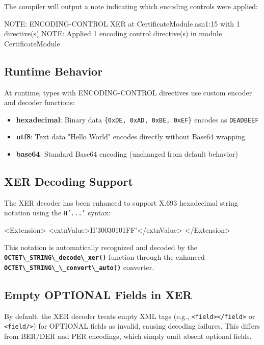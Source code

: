 \documentclass[english,oneside,12pt]{book}
\newcommand{\code}[1]{\texttt{\textbf{\lstinline{#1}}}}
\begin{document}
The compiler will output a note indicating which encoding controls were applied:

\begin{bash}
NOTE: ENCODING-CONTROL XER at CertificateModule.asn1:15 with 1 directive(s)
NOTE: Applied 1 encoding control directive(s) in module CertificateModule
\end{bash}

\subsection*{Runtime Behavior}

At runtime, types with ENCODING-CONTROL directives use custom encoder and decoder functions:

\begin{itemize}
\item \textbf{hexadecimal}: Binary data \texttt{\{0xDE, 0xAD, 0xBE, 0xEF\}} encodes as \texttt{DEADBEEF}
\item \textbf{utf8}: Text data "Hello World" encodes directly without Base64 wrapping
\item \textbf{base64}: Standard Base64 encoding (unchanged from default behavior)
\end{itemize}

\subsection*{XER Decoding Support}

The XER decoder has been enhanced to support X.693 hexadecimal string notation using 
the \texttt{H'...'} syntax:

\begin{example}
<Extension>
    <extnValue>H'30030101FF'</extnValue>
</Extension>
\end{example}

This notation is automatically recognized and decoded by the \code{OCTET\_STRING\_decode\_xer()} 
function through the enhanced \code{OCTET\_STRING\_\_convert\_auto()} converter.

\subsection*{Empty OPTIONAL Fields in XER}

By default, the XER decoder treats empty XML tags (e.g., \texttt{<field></field>} or 
\texttt{<field/>}) for OPTIONAL fields as invalid, causing decoding failures. This differs 
from BER/DER and PER encodings, which simply omit absent optional fields.
\end{document}
